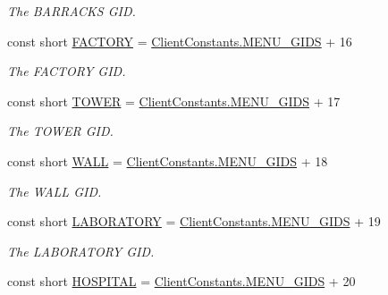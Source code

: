 \begin{DoxyCompactItemize}
\begin{DoxyCompactList}\small\item\em The B\+A\+R\+R\+A\+C\+K\+S G\+I\+D. \end{DoxyCompactList}\item 
const short \hyperlink{classClient_1_1Common_1_1Constants_1_1BuildingMenuGid_a63fc76d8d22080156e156d588dc95be1}{F\+A\+C\+T\+O\+R\+Y} = \hyperlink{classClient_1_1Common_1_1Constants_1_1ClientConstants_a4d3b0e4f36481c991c9995cb20c9347d}{Client\+Constants.\+M\+E\+N\+U\+\_\+\+G\+I\+D\+S} + 16
\begin{DoxyCompactList}\small\item\em The F\+A\+C\+T\+O\+R\+Y G\+I\+D. \end{DoxyCompactList}\item 
const short \hyperlink{classClient_1_1Common_1_1Constants_1_1BuildingMenuGid_a43b996de46e883e87da0f563fe6b70e5}{T\+O\+W\+E\+R} = \hyperlink{classClient_1_1Common_1_1Constants_1_1ClientConstants_a4d3b0e4f36481c991c9995cb20c9347d}{Client\+Constants.\+M\+E\+N\+U\+\_\+\+G\+I\+D\+S} + 17
\begin{DoxyCompactList}\small\item\em The T\+O\+W\+E\+R G\+I\+D. \end{DoxyCompactList}\item 
const short \hyperlink{classClient_1_1Common_1_1Constants_1_1BuildingMenuGid_a1cb772eccafaf5bd7ba8309543bb3e27}{W\+A\+L\+L} = \hyperlink{classClient_1_1Common_1_1Constants_1_1ClientConstants_a4d3b0e4f36481c991c9995cb20c9347d}{Client\+Constants.\+M\+E\+N\+U\+\_\+\+G\+I\+D\+S} + 18
\begin{DoxyCompactList}\small\item\em The W\+A\+L\+L G\+I\+D. \end{DoxyCompactList}\item 
const short \hyperlink{classClient_1_1Common_1_1Constants_1_1BuildingMenuGid_aad3226ea535e019083375bad81083c5f}{L\+A\+B\+O\+R\+A\+T\+O\+R\+Y} = \hyperlink{classClient_1_1Common_1_1Constants_1_1ClientConstants_a4d3b0e4f36481c991c9995cb20c9347d}{Client\+Constants.\+M\+E\+N\+U\+\_\+\+G\+I\+D\+S} + 19
\begin{DoxyCompactList}\small\item\em The L\+A\+B\+O\+R\+A\+T\+O\+R\+Y G\+I\+D. \end{DoxyCompactList}\item 
const short \hyperlink{classClient_1_1Common_1_1Constants_1_1BuildingMenuGid_a84fce8500604ec8f8ef5f68837e13e65}{H\+O\+S\+P\+I\+T\+A\+L} = \hyperlink{classClient_1_1Common_1_1Constants_1_1ClientConstants_a4d3b0e4f36481c991c9995cb20c9347d}{Client\+Constants.\+M\+E\+N\+U\+\_\+\+G\+I\+D\+S} + 20

\end{DoxyCompactItemize}
